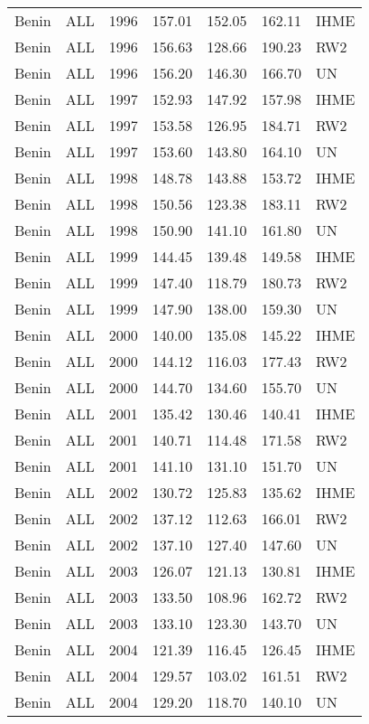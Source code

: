 \begin{longtable}{lllrrrl}
  Benin & ALL & 1996 & 157.01 & 152.05 & 162.11 & IHME \\ 
  Benin & ALL & 1996 & 156.63 & 128.66 & 190.23 & RW2 \\ 
  Benin & ALL & 1996 & 156.20 & 146.30 & 166.70 & UN \\ 
  Benin & ALL & 1997 & 152.93 & 147.92 & 157.98 & IHME \\ 
  Benin & ALL & 1997 & 153.58 & 126.95 & 184.71 & RW2 \\ 
  Benin & ALL & 1997 & 153.60 & 143.80 & 164.10 & UN \\ 
  Benin & ALL & 1998 & 148.78 & 143.88 & 153.72 & IHME \\ 
  Benin & ALL & 1998 & 150.56 & 123.38 & 183.11 & RW2 \\ 
  Benin & ALL & 1998 & 150.90 & 141.10 & 161.80 & UN \\ 
  Benin & ALL & 1999 & 144.45 & 139.48 & 149.58 & IHME \\ 
  Benin & ALL & 1999 & 147.40 & 118.79 & 180.73 & RW2 \\ 
  Benin & ALL & 1999 & 147.90 & 138.00 & 159.30 & UN \\ 
  Benin & ALL & 2000 & 140.00 & 135.08 & 145.22 & IHME \\ 
  Benin & ALL & 2000 & 144.12 & 116.03 & 177.43 & RW2 \\ 
  Benin & ALL & 2000 & 144.70 & 134.60 & 155.70 & UN \\ 
  Benin & ALL & 2001 & 135.42 & 130.46 & 140.41 & IHME \\ 
  Benin & ALL & 2001 & 140.71 & 114.48 & 171.58 & RW2 \\ 
  Benin & ALL & 2001 & 141.10 & 131.10 & 151.70 & UN \\ 
  Benin & ALL & 2002 & 130.72 & 125.83 & 135.62 & IHME \\ 
  Benin & ALL & 2002 & 137.12 & 112.63 & 166.01 & RW2 \\ 
  Benin & ALL & 2002 & 137.10 & 127.40 & 147.60 & UN \\ 
  Benin & ALL & 2003 & 126.07 & 121.13 & 130.81 & IHME \\ 
  Benin & ALL & 2003 & 133.50 & 108.96 & 162.72 & RW2 \\ 
  Benin & ALL & 2003 & 133.10 & 123.30 & 143.70 & UN \\ 
  Benin & ALL & 2004 & 121.39 & 116.45 & 126.45 & IHME \\ 
  Benin & ALL & 2004 & 129.57 & 103.02 & 161.51 & RW2 \\ 
  Benin & ALL & 2004 & 129.20 & 118.70 & 140.10 & UN \\ 

\end{longtable}
